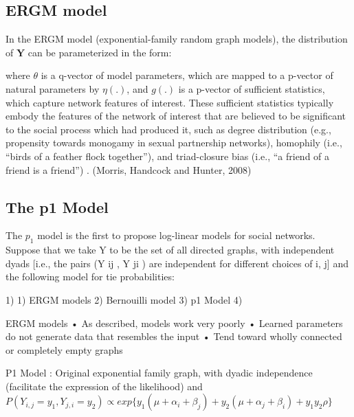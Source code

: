 \documentclass[12pt]{ociamthesis}  %
\begin{document}
	
	\subsection{ERGM model}
	In the ERGM model (exponential-family random graph models), the distribution of $\textbf{Y}$ can be parameterized in the form:
	
	
	where $\theta$ is a q-vector of model parameters, which are mapped to a p-vector of natural parameters
	by $\eta(.)$, and $g(.)$ is a p-vector of sufficient statistics, which capture network features of interest. These sufficient statistics typically embody the
	features of the network of interest that are believed to be significant to the social
	process which had produced it, such as degree distribution (e.g., propensity
	towards monogamy in sexual partnership networks), homophily (i.e., “birds of
	a feather flock together”), and triad-closure bias (i.e., “a friend of a friend is a
	friend”) . (Morris, Handcock and Hunter, 2008)
	
	\subsection{The p1 Model}
	
	The $p_{1}$ model is the first to propose log-linear models for social
	networks. Suppose that we take Y to be the set of all directed graphs, with independent dyads [i.e., the pairs (Y ij , Y ji ) are independent for different choices of {i, j}] and the following model for tie probabilities:
	
	1) 
	1) ERGM models
	2) Bernouilli model
	3) p1 Model
	4) 
	
	ERGM models • As described, models work very poorly
	• Learned parameters do not generate data that resembles the input
	• Tend toward wholly connected or completely empty graphs
	
	
	
	
	
	
	
	
	
	
	
	
	
	P1 Model : Original exponential family graph, with dyadic independence (facilitate the expression of the likelihood) and $P(Y_{i,j} = y_{1}, Y_{j,i} = y_{2}) \propto exp\{  y_{1}(\mu + \alpha_{i} + \beta_{j}) + y_{2}(\mu + \alpha_{j} + \beta_{i}) + y_{1}y_{2}\rho \}   $
	
\end{document}
